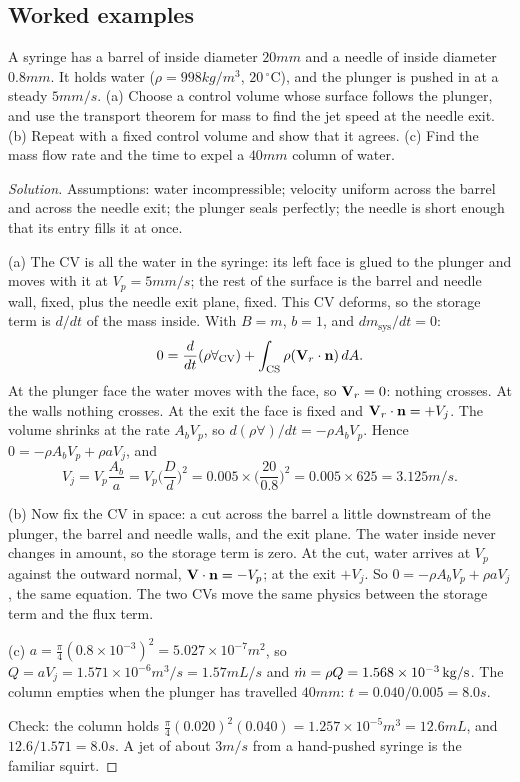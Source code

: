 \subsection*{Worked examples}

\begin{example}
A syringe has a barrel of inside diameter $20\unit{mm}$ and a needle of inside diameter $0.8\unit{mm}$. It holds water ($\rho = 998\unit{kg/m^3}$, $20\,^\circ$C), and the plunger is pushed in at a steady $5\unit{mm/s}$. (a) Choose a control volume whose surface follows the plunger, and use the transport theorem for mass to find the jet speed at the needle exit. (b) Repeat with a fixed control volume and show that it agrees. (c) Find the mass flow rate and the time to expel a $40\unit{mm}$ column of water.
\end{example}

\begin{proof}[Solution]
Assumptions: water incompressible; velocity uniform across the barrel and across the needle exit; the plunger seals perfectly; the needle is short enough that its entry fills it at once.

(a) The CV is all the water in the syringe: its left face is glued to the plunger and moves with it at $V_p = 5\unit{mm/s}$; the rest of the surface is the barrel and needle wall, fixed, plus the needle exit plane, fixed. This CV deforms, so the storage term is $d/dt$ of the mass inside. With $B = m$, $b = 1$, and $dm_\text{sys}/dt = 0$:
\[
0 = \frac{d}{dt}(\rho\forall_\text{CV}) + \int_\text{CS}\rho(\mathbf{V}_r\cdot\mathbf{n})\,dA .
\]
At the plunger face the water moves with the face, so $\mathbf{V}_r = 0$: nothing crosses. At the walls nothing crosses. At the exit the face is fixed and $\mathbf{V}_r\cdot\mathbf{n} = +V_j$. The volume shrinks at the rate $A_bV_p$, so $d(\rho\forall)/dt = -\rho A_b V_p$. Hence $0 = -\rho A_bV_p + \rho aV_j$, and
\[
V_j = V_p\frac{A_b}{a} = V_p\Big(\frac{D}{d}\Big)^2 = 0.005 \times \Big(\frac{20}{0.8}\Big)^2 = 0.005\times 625 = 3.125\unit{m/s}.
\]

(b) Now fix the CV in space: a cut across the barrel a little downstream of the plunger, the barrel and needle walls, and the exit plane. The water inside never changes in amount, so the storage term is zero. At the cut, water arrives at $V_p$ against the outward normal, $\mathbf{V}\cdot\mathbf{n} = -V_p$; at the exit $+V_j$. So $0 = -\rho A_bV_p + \rho aV_j$, the same equation. The two CVs move the same physics between the storage term and the flux term.

(c) $a = \tfrac{\pi}{4}(0.8\times10^{-3})^2 = 5.027\times10^{-7}\unit{m^2}$, so $Q = aV_j = 1.571\times10^{-6}\unit{m^3/s} = 1.57\unit{mL/s}$ and $\dot m = \rho Q = 1.568\times10^{-3}\,\mathrm{kg/s}$. The column empties when the plunger has travelled $40\unit{mm}$: $t = 0.040/0.005 = 8.0\unit{s}$.

Check: the column holds $\tfrac{\pi}{4}(0.020)^2(0.040) = 1.257\times10^{-5}\unit{m^3} = 12.6\unit{mL}$, and $12.6/1.571 = 8.0\unit{s}$. A jet of about $3\unit{m/s}$ from a hand-pushed syringe is the familiar squirt.
\end{proof}

